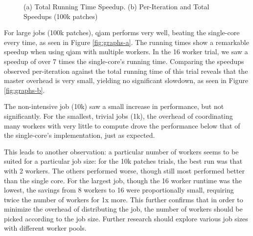 \documentclass[%
  final,
  notitlepage,
  narroweqnarray,
  inline,
]{ieee}
\begin{document}
\begin{figure}[ht!]
  \centering
  \caption{(a) Total Running Time Speedup. (b) Per-Iteration and Total Speedups
    (100k patches)}
  \label{fig:graphs}
\end{figure}

For large jobs (100k patches), qjam performs very well, beating the single-core
every time, as seen in Figure \ref{fig:graphs-a}. The running times show a
remarkable speedup when using qjam with multiple workers. In the 16 worker
trial, we saw a speedup of over 7 times the single-core's running
time. Comparing the speedups observed per-iteration against the total running
time of this trial reveals that the master overhead is very small, yielding no
significant slowdown, as seen in Figure \ref{fig:graphs-b}.

The non-intensive job (10k) saw a small increase in performance, but not
significantly. For the smallest, trivial jobs (1k), the overhead of
coordinating many workers with very little to compute drove the performance
below that of the single-core's implementation, just as expected.

This leads to another observation: a particular number of workers seems to be
suited for a particular job size: for the 10k patches trials, the best run was
that with 2 workers. The others performed worse, though still most performed
better than the single core. For the largest job, though the 16 worker runtime
was the lowest, the savings from 8 workers to 16 were proportionally small,
requiring twice the number of workers for 1x more. This further confirms that
in order to minimize the overhead of distributing the job, the number of
workers should be picked according to the job size. Further research should
explore various job sizes with different worker pools.
\end{document}
